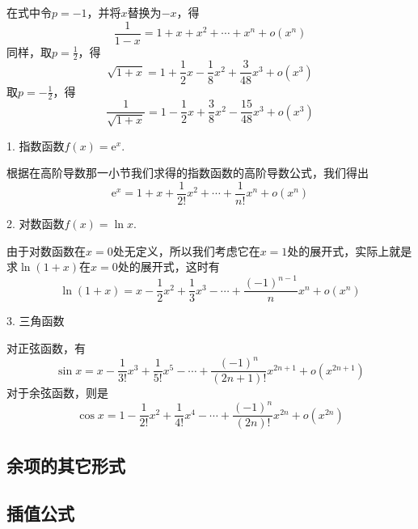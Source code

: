 在式中令$p=-1$，并将$x$替换为$-x$，得
\[ \frac{1}{1-x} = 1+x+x^2 + \cdots + x^n + o(x^n) \]
同样，取$p=\frac{1}{2}$，得
\[ \sqrt{1+x} = 1+\frac{1}{2}x-\frac{1}{8}x^2+\frac{3}{48}x^3 + o(x^3) \]
取$p=-\frac{1}{2}$，得
\[ \frac{1}{\sqrt{1+x}} = 1-\frac{1}{2}x+\frac{3}{8}x^2 -\frac{15}{48}x^3 + o(x^3) \]

1. 指数函数$f(x)=\mathrm{e}^x$.

根据在高阶导数那一小节我们求得的指数函数的高阶导数公式，我们得出
\[ \mathrm{e}^x = 1+x+\frac{1}{2!}x^2 + \cdots + \frac{1}{n!}x^n + o(x^n) \]

2. 对数函数$f(x)=\ln{x}$.

由于对数函数在$x=0$处无定义，所以我们考虑它在$x=1$处的展开式，实际上就是求$\ln{(1+x)}$在$x=0$处的展开式，这时有
\[ \ln{(1+x)} = x - \frac{1}{2} x^2 + \frac{1}{3} x^3 - \cdots + \frac{(-1)^{n-1}}{n}x^n + o(x^n) \]

3. 三角函数

对正弦函数，有
\[ \sin{x} = x - \frac{1}{3!}x^3 + \frac{1}{5!} x^5 - \cdots + \frac{(-1)^n}{(2n+1)!}x^{2n+1} + o(x^{2n+1}) \]
对于余弦函数，则是
\[ \cos{x} = 1 - \frac{1}{2!}x^2 + \frac{1}{4!}x^4 - \cdots + \frac{(-1)^n}{(2n)!}x^{2n} + o(x^{2n}) \]

\subsection{余项的其它形式}
\label{sec:other-format-of-taylor-additional}



\subsection{插值公式}
\label{sec:interpolation-formula}




